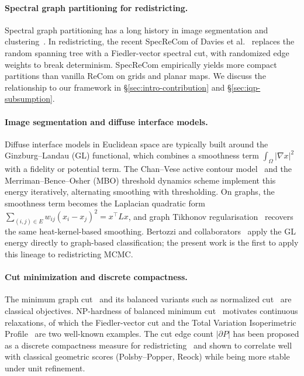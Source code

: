 \documentclass[11pt]{article}
\begin{document}
\paragraph{Spectral graph partitioning for redistricting.}\label{sec:related-spectral}

Spectral graph partitioning has a long history in image segmentation
and clustering~\cite{shi2000normalized}. In redistricting, the recent
SpecReCom of Davies et al.~\cite{davies2025spectral} replaces the
random spanning tree with a Fiedler-vector spectral cut, with
randomized edge weights to break determinism. SpecReCom empirically
yields more compact partitions than vanilla ReCom on grids and planar
maps. We discuss the relationship to our framework in
\S\ref{sec:intro-contribution} and \S\ref{sec:iqp-subsumption}.

\paragraph{Image segmentation and diffuse interface models.}\label{sec:related-image}

Diffuse interface models in Euclidean space are typically built around
the Ginzburg--Landau (GL) functional, which combines a smoothness term
$\int_\Omega |\nabla x|^2$ with a fidelity or potential term. The
Chan--Vese active contour model~\cite{chan2001active} and the
Merriman--Bence--Osher (MBO) threshold dynamics scheme implement this
energy iteratively, alternating smoothing with thresholding. On
graphs, the smoothness term becomes the Laplacian quadratic form
$\sum_{(i,j) \in E} w_{ij}(x_i - x_j)^2 = x^\top L x$, and graph
Tikhonov regularisation~\cite{pilavci2021graph,shuman2013emerging}
recovers the same heat-kernel-based smoothing. Bertozzi and
collaborators~\cite{bertozzi2012diffuse} apply the GL energy directly
to graph-based classification; the present work is the first to apply
this lineage to redistricting MCMC.

\paragraph{Cut minimization and discrete compactness.}\label{sec:related-cut}

The minimum graph cut~\cite{stoer1997simple,karger2000minimum} and its
balanced variants such as normalized cut~\cite{shi2000normalized} are
classical objectives. NP-hardness of balanced minimum
cut~\cite{wagner1993between} motivates continuous relaxations, of
which the Fiedler-vector cut and the Total Variation Isoperimetric
Profile~\cite{deford2019total} are two well-known examples. The cut
edge count $|\partial P|$ has been proposed as a discrete compactness
measure for redistricting~\cite{duchin2018discrete} and shown to
correlate well with classical geometric scores (Polsby--Popper, Reock)
while being more stable under unit refinement.
\end{document}
